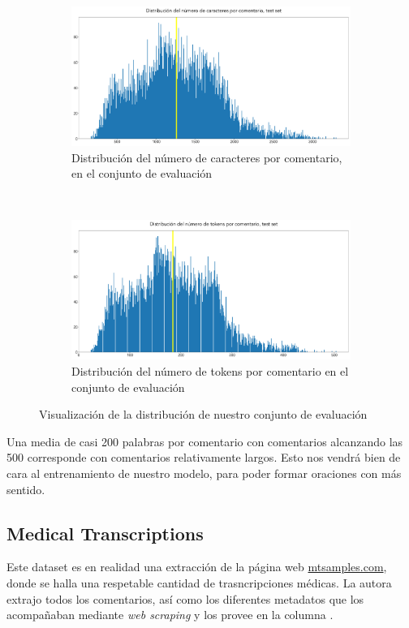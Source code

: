 \begin{figure}[h!]
	\centering
	\begin{subfigure}[t]{0.95\textwidth}
		\centering
		\includegraphics[width=.9\textwidth]{media/char_hist_test.pdf}
		\caption{Distribución del número de caracteres por comentario, en el conjunto de evaluación}
		\label{fig:avg_char_test_test}
	\end{subfigure}

	~

	\begin{subfigure}[t]{0.95\textwidth}
		\centering
		\includegraphics[width=.9\textwidth]{media/tokens_hist_test.pdf}
		\caption{Distribución del número de tokens por comentario en el conjunto de evaluación}
		\label{fig:avg_tokens_test}
	\end{subfigure}


	\caption{Visualización de la distribución de nuestro conjunto de evaluación}
	\label{fig:sum_test}
\end{figure}

Una media de casi 200 palabras por comentario con comentarios alcanzando las 500 corresponde con comentarios relativamente largos. Esto nos vendrá bien de cara al entrenamiento de nuestro modelo, para poder formar oraciones con más sentido.


\subsection{Medical Transcriptions}
Este dataset es en realidad una extracción de la página web \url{mtsamples.com}, donde se halla una respetable cantidad de trasncripciones médicas. La autora extrajo todos los comentarios, así como los diferentes metadatos que los acompañaban mediante \textit{web scraping} y los provee en la columna . 

